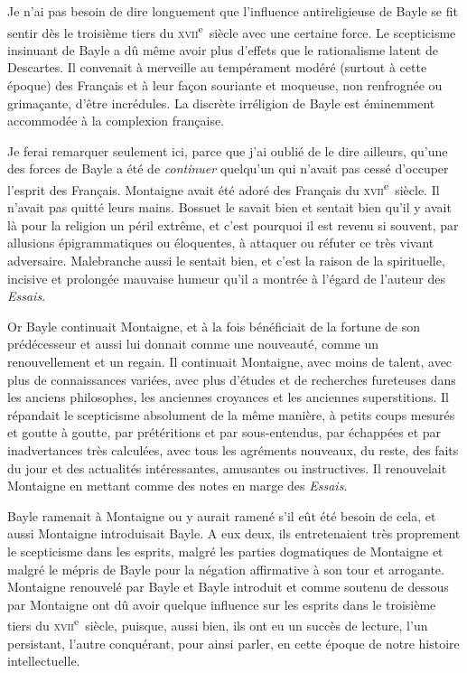 \documentclass[french,twoside]{book} %
\newcommand{\astertri}{\medskip\par\centerline{\color{rubric}\large\selectfont{\syms ✻\,✻\,✻}}\medskip\par}%
\begin{document}
\astertri

\noindent Je n’ai pas besoin de dire longuement que l’influence antireligieuse de Bayle se fit sentir dès le troisième tiers du \textsc{xvii}\textsuperscript{e} siècle avec une certaine force. Le scepticisme insinuant de Bayle a dû même avoir plus d’effets que le rationalisme latent de Descartes. Il convenait à merveille au tempérament modéré (surtout à cette époque) des Français et à leur façon souriante et moqueuse, non renfrognée ou grimaçante, d’être incrédules. La discrète irréligion de Bayle est éminemment accommodée à la complexion française.\par
Je ferai remarquer seulement ici, parce que j’ai oublié de le dire ailleurs, qu’une des forces de Bayle a été de {\itshape continuer} quelqu’un qui n’avait pas cessé d’occuper l’esprit des Français. Montaigne avait été adoré des Français du \textsc{xvii}\textsuperscript{e} siècle. Il n’avait pas quitté leurs mains. Bossuet le savait bien et sentait bien qu’il y avait là pour la religion un péril extrême, et c’est pourquoi il est revenu si  souvent, par allusions épigrammatiques ou éloquentes, à attaquer ou réfuter ce très vivant adversaire. Malebranche aussi le sentait bien, et c’est la raison de la spirituelle, incisive et prolongée mauvaise humeur qu’il a montrée à l’égard de l’auteur des \emph{Essais}.\par
Or Bayle continuait Montaigne, et à la fois bénéficiait de la fortune de son prédécesseur et aussi lui donnait comme une nouveauté, comme un renouvellement et un regain. Il continuait Montaigne, avec moins de talent, avec plus de connaissances variées, avec plus d’études et de recherches fureteuses dans les anciens philosophes, les anciennes croyances et les anciennes superstitions. Il répandait le scepticisme absolument de la même manière, à petits coups mesurés et goutte à goutte, par prétéritions et par sous-entendus, par échappées et par inadvertances très calculées, avec tous les agréments nouveaux, du reste, des faits du jour et des actualités intéressantes, amusantes ou instructives. Il renouvelait Montaigne en mettant comme des notes en marge des \emph{Essais}.\par
Bayle ramenait à Montaigne ou y aurait ramené s’il eût été besoin de cela, et aussi Montaigne introduisait Bayle. A eux deux, ils entretenaient très proprement le scepticisme dans les esprits, malgré les parties dogmatiques de Montaigne et malgré  le mépris de Bayle pour la négation affirmative à son tour et arrogante. Montaigne renouvelé par Bayle et Bayle introduit et comme soutenu de dessous par Montaigne ont dû avoir quelque influence sur les esprits dans le troisième tiers du \textsc{xvii}\textsuperscript{e} siècle, puisque, aussi bien, ils ont eu un succès de lecture, l’un persistant, l’autre conquérant, pour ainsi parler, en cette époque de notre histoire intellectuelle.\par
\end{document}
